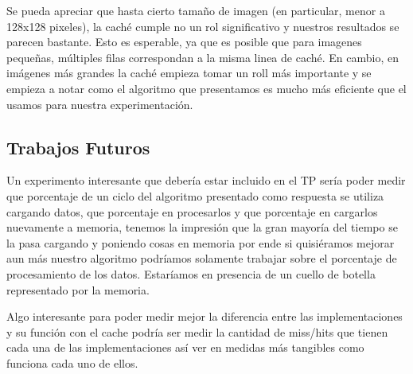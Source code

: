 Se pueda apreciar que hasta cierto tamaño de imagen (en particular, menor a 128x128 pixeles), la caché cumple no un rol significativo y nuestros resultados se parecen bastante. Esto es esperable, ya que es posible que para imagenes pequeñas, múltiples filas correspondan a la misma linea de caché. En cambio, en imágenes más grandes la caché empieza tomar un roll más importante y se empieza a notar como el algoritmo que presentamos es mucho más eficiente que el usamos para nuestra experimentación.

\subsection{Trabajos Futuros}
Un experimento interesante que debería estar incluido en el TP sería poder medir que porcentaje de un ciclo del algoritmo presentado como respuesta se utiliza cargando datos, que porcentaje en procesarlos y que porcentaje en cargarlos nuevamente a memoria, tenemos la impresión que la gran mayoría del tiempo se la pasa cargando y poniendo cosas en memoria por ende si quisiéramos mejorar aun más nuestro algoritmo podríamos solamente trabajar sobre el porcentaje de procesamiento de los datos. Estaríamos en presencia de un cuello de botella representado por la memoria.

Algo interesante para poder medir mejor la diferencia entre las implementaciones y su función con el cache podría ser medir la cantidad de miss/hits que tienen cada una de las implementaciones así ver en medidas más tangibles como funciona cada uno de ellos.
